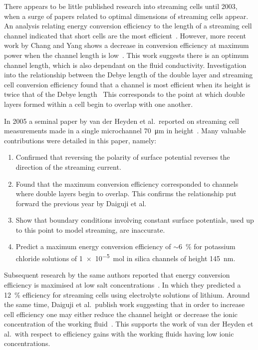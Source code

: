   There appears to be little published research into streaming cells until 2003, when a surge of papers related to optimal dimensions of streaming cells appear.
  An analysis relating energy conversion efficiency to the length of a streaming cell channel indicated that short cells are the most efficient~\cite{Yang2003}.
  However, more recent work by Chang and Yang shows a decrease in conversion efficiency at maximum power when the channel length is low~\cite{Chang2009}.
  This work suggests there is an optimum channel length, which is also dependant on the fluid conductivity.
  Investigation into the relationship between the Debye length of the double layer and streaming cell conversion efficiency found that a channel is most efficient when its height is twice that of the Debye length~\cite{Daiguji2004}
  This corresponds to the point at which double layers formed within a cell begin to overlap with one another.  

  In 2005 a seminal paper by van der Heyden et al.\ reported on streaming cell measurements made in a single microchannel \SI{70}{\micro\meter} in height~\cite{VanderHeyden2005}.
  Many valuable contributions were detailed in this paper, namely:
  \begin{enumerate}
    \item Confirmed that reversing the polarity of surface potential reverses the direction of the streaming current.
    \item Found that the maximum conversion efficiency corresponded to channels where double layers begin to overlap. This confirms the relationship put forward the previous year by Daiguji et al.\
    \item Show that boundary conditions involving constant surface potentials, used up to this point to model streaming, are inaccurate.
    \item Predict a maximum energy conversion efficiency of $\sim$\SI{6}{\percent} for potassium chloride solutions of \SI{1e-5}{\mole} in silica channels of height \SI{145}{\nano\meter}.
  \end{enumerate}
  Subsequent research by the same authors reported that energy conversion efficiency is maximised at low salt concentrations~\cite{VanderHeyden2006}. 
  In which they predicted a \SI{12}{\percent} efficiency for streaming cells using electrolyte solutions of lithium.
  Around the same time, Daiguji et al.\ publish work suggesting that in order to increase cell efficiency one may either reduce the channel height or decrease the ionic concentration of the working fluid~\cite{Daiguji2006}.
  This supports the work of van der Heyden et al.\ with respect to efficiency gains with the working fluids having low ionic concentrations.

